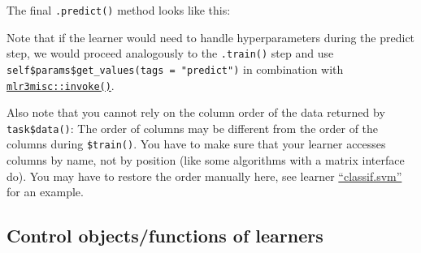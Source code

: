 \documentclass[]{scrbook}
\newenvironment{Shaded}{\begin{snugshade}}{\end{snugshade}}
\newcommand{\ControlFlowTok}[1]{\textcolor[rgb]{0.13,0.29,0.53}{\textbf{#1}}}
\newcommand{\DataTypeTok}[1]{\textcolor[rgb]{0.13,0.29,0.53}{#1}}
\newcommand{\KeywordTok}[1]{\textcolor[rgb]{0.13,0.29,0.53}{\textbf{#1}}}
\newcommand{\NormalTok}[1]{#1}
\newcommand{\OperatorTok}[1]{\textcolor[rgb]{0.81,0.36,0.00}{\textbf{#1}}}
\newcommand{\StringTok}[1]{\textcolor[rgb]{0.31,0.60,0.02}{#1}}
\renewenvironment{Shaded} {\begin{snugshade}\small} {\end{snugshade}}
\begin{document}
The final \texttt{.predict()} method looks like this:

\begin{Shaded}
\end{Shaded}

Note that if the learner would need to handle hyperparameters during the predict step, we would proceed analogously to the \texttt{.train()} step and use \texttt{self\$params\$get\_values(tags\ =\ "predict")} in combination with \href{https://mlr3misc.mlr-org.com/reference/invoke.html}{\texttt{mlr3misc::invoke()}}.

Also note that you cannot rely on the column order of the data returned by \texttt{task\$data()}: The order of columns may be different from the order of the columns during \texttt{\$train()}.
You have to make sure that your learner accesses columns by name, not by position (like some algorithms with a matrix interface do).
You may have to restore the order manually here, see learner \href{https://github.com/mlr-org/mlr3learners/blob/master/R/LearnerClassifSVM.R}{``classif.svm''} for an example.

\hypertarget{learner-control}{%
\subsection{Control objects/functions of learners}\label{learner-control}}
\end{document}
